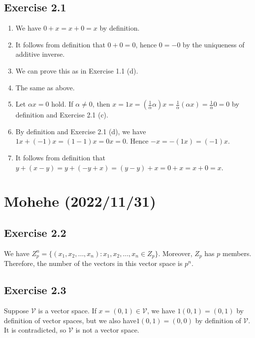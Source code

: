 \documentclass{article}
\begin{document}
\subsection{Exercise 2.1}
\begin{enumerate}[label = (\alph*)]
\item We have $0+x = x+0 = x$ by definition.
\item It follows from definition that $0+0=0$, hence $0 = -0$ by the uniqueness of additive inverse.
\item We can prove this as in Exercise 1.1 (d).
\item The same as above.
\item Let $\alpha x = 0$ hold.
If $\alpha \ne 0$, then $x = 1x = (\frac{1}{\alpha}\alpha)x = \frac{1}{\alpha} (\alpha x) = \frac{1}{\alpha}0 = 0$ by definition and Exercise 2.1 (c).
\item By definition and Exercise 2.1 (d), we have $1x + (-1)x = (1-1)x  = 0x =0$.
Hence $-x = -(1x) = (-1)x$.
\item It follows from definition that $y + (x-y) = y + (-y + x) = (y - y) + x = 0 + x =x + 0 = x$.
\end{enumerate}

\section{Mohehe (2022/11/31)}
\newcommand \V{\mathcal{V}}
\subsection{Exercise 2.2}
We have $Z_p^n = \{(x_1,x_2, \dots , x_n):x_1,x_2,\dots,x_n \in Z_p\}$.
Moreover, $Z_p$ has $p$ members.
Therefore, the number of  the vectors in this vector space is $p^n$.

\subsection{Exercise 2.3}
Suppose $\V$ is a vector space.
If $x = (0,1) \in \V$, we have $1(0,1) = (0,1)$ by definition of vector spaces, but we also have$1(0,1) = (0,0)$ by definition of $\V$. It is contradicted, so $\V$ is not a vector space.
\end{document}
